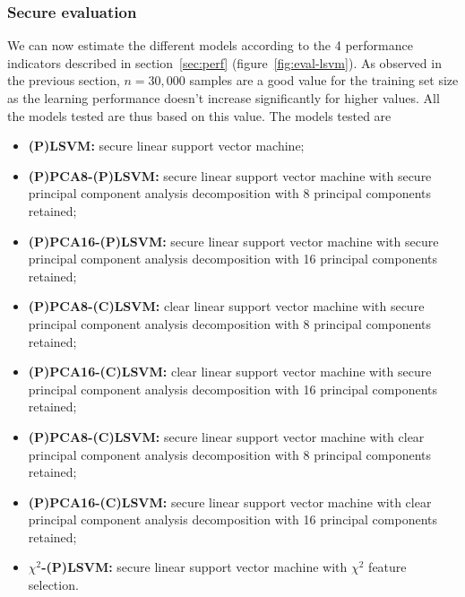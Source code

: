\subsubsection{Secure evaluation}
We can now estimate the different models according to the 4 performance indicators described in section~\ref{sec:perf} (figure~\ref{fig:eval-lsvm}). As observed in the previous section, $n=30,000$ samples are a good value for the training set size as the learning performance doesn't increase significantly for higher values. All the models tested are thus based on this value. The models tested are
\begin{itemize}
    \item \textbf{(P)LSVM:} secure linear support vector machine;
    \item \textbf{(P)PCA8-(P)LSVM:} secure linear support vector machine with secure principal component analysis decomposition with 8 principal components retained;
    \item \textbf{(P)PCA16-(P)LSVM:} secure linear support vector machine with secure principal component analysis decomposition with 16 principal components retained;
    \item \textbf{(P)PCA8-(C)LSVM:} clear linear support vector machine with secure principal component analysis decomposition with 8 principal components retained;
    \item \textbf{(P)PCA16-(C)LSVM:} clear linear support vector machine with secure principal component analysis decomposition with 16 principal components retained;
    \item \textbf{(P)PCA8-(C)LSVM:} secure linear support vector machine with clear principal component analysis decomposition with 8 principal components retained;
    \item \textbf{(P)PCA16-(C)LSVM:} secure linear support vector machine with clear principal component analysis decomposition with 16 principal components retained;
    \item \textbf{$\chi^2$-(P)LSVM:} secure linear support vector machine with $\chi^2$ feature selection.
\end{itemize}

